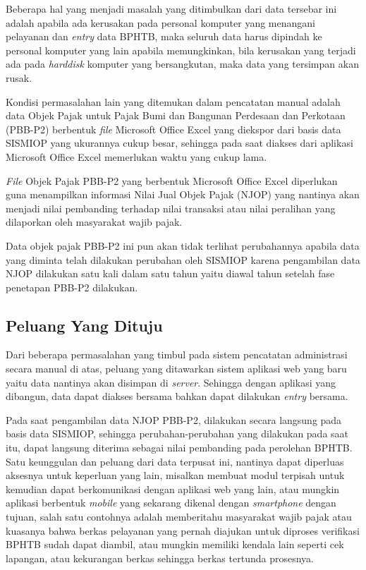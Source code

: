 \documentclass[pdftex,12pt, oneside]{article}
\begin{document}
Beberapa hal yang menjadi masalah yang ditimbulkan dari data tersebar ini adalah apabila ada kerusakan pada personal komputer yang menangani pelayanan dan \textit{entry} data BPHTB, maka seluruh data harus dipindah ke personal komputer yang lain apabila memungkinkan, bila kerusakan yang terjadi ada pada \textit{harddisk} komputer yang bersangkutan, maka data yang tersimpan akan rusak.

Kondisi permasalahan lain yang ditemukan dalam pencatatan manual adalah data Objek Pajak untuk Pajak Bumi dan Bangunan Perdesaan dan Perkotaan (PBB-P2) berbentuk \textit{file} Microsoft Office Excel yang diekspor dari basis data SISMIOP yang ukurannya cukup besar, sehingga pada saat diakses dari aplikasi Microsoft Office Excel memerlukan waktu yang cukup lama.

\textit{File} Objek Pajak PBB-P2 yang berbentuk Microsoft Office Excel diperlukan guna menampilkan informasi Nilai Jual Objek Pajak (NJOP) yang nantinya akan menjadi nilai pembanding terhadap nilai transaksi atau nilai peralihan yang dilaporkan oleh masyarakat wajib pajak.

Data objek pajak PBB-P2 ini pun akan tidak terlihat perubahannya apabila data yang diminta telah dilakukan perubahan oleh SISMIOP karena pengambilan data NJOP dilakukan satu kali dalam satu tahun yaitu diawal tahun setelah fase penetapan PBB-P2 dilakukan.

\subsection{Peluang Yang Dituju}

Dari beberapa permasalahan yang timbul pada sistem pencatatan administrasi secara manual di atas, peluang yang ditawarkan sistem aplikasi web yang baru yaitu data nantinya akan disimpan di \textit{server}. Sehingga dengan aplikasi yang dibangun, data dapat diakses bersama bahkan dapat dilakukan \textit{entry} bersama.

Pada saat pengambilan data NJOP PBB-P2, dilakukan secara langsung pada basis data SISMIOP, sehingga perubahan-perubahan yang dilakukan pada saat itu, dapat langsung diterima sebagai nilai pembanding pada perolehan BPHTB. Satu keunggulan dan peluang dari data terpusat ini, nantinya dapat diperluas aksesnya untuk keperluan yang lain, misalkan membuat modul terpisah untuk kemudian dapat berkomunikasi dengan aplikasi web yang lain, atau mungkin aplikasi berbentuk \textit{mobile} yang sekarang dikenal dengan \textit{smartphone} dengan tujuan, salah satu contohnya adalah memberitahu masyarakat wajib pajak atau kuasanya bahwa berkas pelayanan yang pernah diajukan untuk diproses verifikasi BPHTB sudah dapat diambil, atau mungkin memiliki kendala lain seperti cek lapangan, atau kekurangan berkas sehingga berkas tertunda prosesnya.
\end{document}
